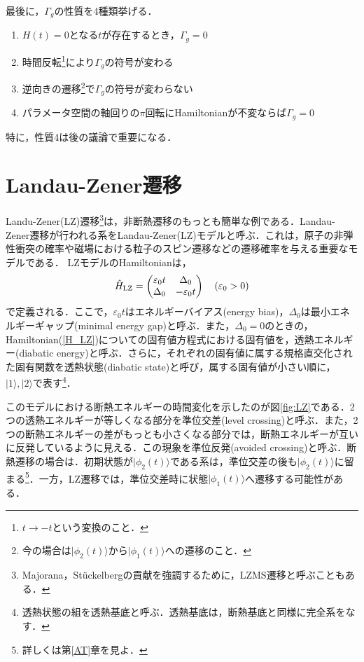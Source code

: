 \documentclass[a4paper, titlepage]{jsreport}
\begin{document}
最後に，$\Gamma_g$の性質を4種類挙げる\cite{Berry1990}．
  \begin{enumerate}
    \item $H(t) = 0$となる$t$が存在するとき，$\Gamma_g = 0$
    \item 時間反転\footnote{$t \rightarrow -t$という変換のこと．}により$\Gamma_g$の符号が変わる
    \item 逆向きの遷移\footnote{今の場合は$|\phi_2(t) \rangle$から$|\phi_1(t) \rangle$への遷移のこと．}で$\Gamma_g$の符号が変わらない
    \item パラメータ空間の軸回りの$\pi$回転にHamiltonianが不変ならば$\Gamma_g = 0$
  \end{enumerate}
特に，性質4は後の議論で重要になる．

\section{Landau-Zener遷移}
Landu-Zener(LZ)遷移\footnote{Majorana，St\"{u}ckelbergの貢献を強調するために，LZMS遷移と呼ぶこともある\cite{Ivakhnenko}．}は，非断熱遷移のもっとも簡単な例である．Landau-Zener遷移が行われる系をLandau-Zener(LZ)モデルと呼ぶ\cite{Zener}．これは，原子の非弾性衝突の確率や磁場における粒子のスピン遷移などの遷移確率を与える重要なモデルである．
LZモデルのHamiltonianは，
\begin{equation}
  \Hat{H}_{\mathrm{LZ}} =
  \begin{pmatrix}
    \varepsilon_0 t & \Delta_0\\
    \Delta_0 & -\varepsilon_0 t \label{H_LZ}
  \end{pmatrix} \quad (\varepsilon_0 > 0)
\end{equation}
で定義される．ここで，$\varepsilon_0 t$はエネルギーバイアス(energy bias)，$\Delta_0$は最小エネルギーギャップ(minimal energy gap)と呼ぶ．また，$\Delta_0 = 0$のときの，Hamiltonian(\ref{H_LZ})についての固有値方程式における固有値を，透熱エネルギー(diabatic energy)と呼ぶ．さらに，それぞれの固有値に属する規格直交化された固有関数を透熱状態(diabatic state)と呼び，属する固有値が小さい順に，$|1\rangle,|2\rangle$で表す\footnote{透熱状態の組を透熱基底と呼ぶ．透熱基底は，断熱基底と同様に完全系をなす．}．


このモデルにおける断熱エネルギーの時間変化を示したのが図\ref{fig:LZ}である．2つの透熱エネルギーが等しくなる部分を準位交差(level crossing)と呼ぶ．また，2つの断熱エネルギーの差がもっとも小さくなる部分では，断熱エネルギーが互いに反発しているように見える．この現象を準位反発(avoided crossing)と呼ぶ．断熱遷移の場合は．初期状態が$| \phi_2(t)\rangle$である系は，準位交差の後も$|\phi_2(t)\rangle$に留まる\footnote{詳しくは第\ref{AT}章を見よ．}．一方，LZ遷移では，準位交差時に状態$|\phi_1(t) \rangle$へ遷移する可能性がある．
\end{document}
